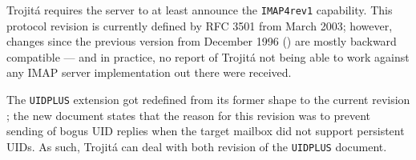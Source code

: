\documentclass[trojita]{subfiles}
\begin{document}
Trojitá requires the server to at least announce the {\tt IMAP4rev1} capability.  This protocol revision is currently
defined by RFC 3501 \cite{rfc3501} from March 2003; however, changes since the previous version from December 1996
(\cite{rfc2060}) are mostly backward compatible --- and in practice, no report of Trojitá not being able to work against
any IMAP server implementation out there were received.

The {\tt UIDPLUS} extension got redefined from its former shape \cite{rfc2359} to the current revision \cite{rfc4315};
the new document states that the reason for this revision was to prevent sending of bogus UID replies when the target
mailbox did not support persistent UIDs.  As such, Trojitá can deal with both revision of the {\tt UIDPLUS} document.
\end{document}
